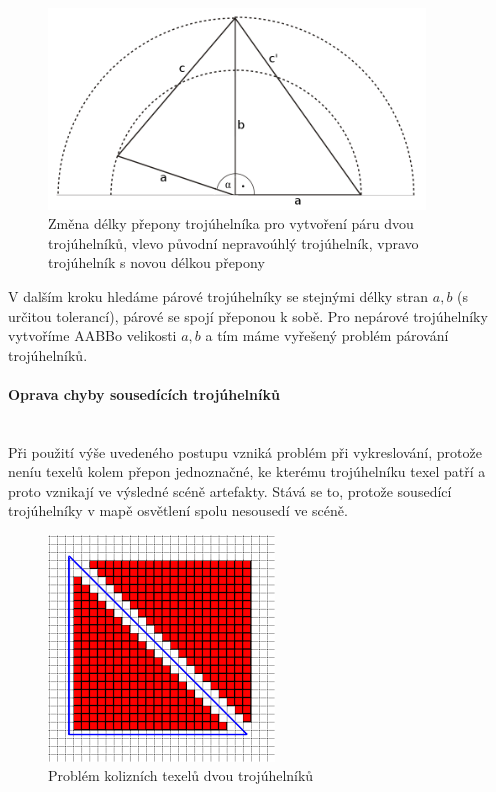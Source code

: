 \documentclass[11pt,twoside,a4paper]{book}
\begin{document}
\begin{center}
\begin{figure}[h]
\includegraphics[width=100mm]{figures/triangle.png}
\caption{Změna délky přepony trojúhelníka pro vytvoření páru dvou trojúhelníků, vlevo původní nepravoúhlý trojúhelník, vpravo trojúhelník s novou délkou přepony}
\end{figure}
\end{center}

V dalším kroku hledáme párové trojúhelníky se stejnými délky stran $a, b$ (s určitou tolerancí), párové se spojí přeponou k sobě. Pro nepárové trojúhelníky vytvoříme AABB\linebreak o velikosti $a, b$ a tím máme vyřešený problém párování trojúhelníků.
\newpage

\paragraph{Oprava chyby sousedících trojúhelníků}\mbox{}\\

Při použití výše uvedeného postupu vzniká problém při vykreslování, protože není\linebreak u texelů kolem přepon jednoznačné, ke kterému trojúhelníku texel patří a proto vznikají ve výsledné scéně artefakty. Stává se to, protože sousedící trojúhelníky v mapě osvětlení spolu nesousedí ve scéně.

\begin{center}
\begin{figure}[h]
\includegraphics[width=60mm]{figures/lmfix.png}
\caption{Problém kolizních texelů dvou trojúhelníků}
\end{figure}
\end{center}
\end{document}
